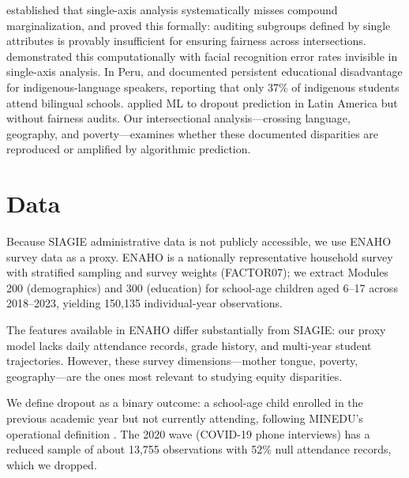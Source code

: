 \documentclass[notitlepage,12pt]{jedm}
\begin{document}
 established that single-axis analysis systematically misses compound marginalization, and  proved this formally: auditing subgroups defined by single attributes is provably insufficient for ensuring fairness across intersections.  demonstrated this computationally with facial recognition error rates invisible in single-axis analysis. In Peru,  and  documented persistent educational disadvantage for indigenous-language speakers, reporting that only 37\% of indigenous students attend bilingual schools.  applied ML to dropout prediction in Latin America but without fairness audits. Our intersectional analysis---crossing language, geography, and poverty---examines whether these documented disparities are reproduced or amplified by algorithmic prediction.

\section{Data}

Because SIAGIE administrative data is not publicly accessible, we use ENAHO survey data as a proxy. ENAHO is a nationally representative household survey with stratified sampling and survey weights (FACTOR07); we extract Modules 200 (demographics) and 300 (education) for school-age children aged 6--17 across 2018--2023, yielding 150,135 individual-year observations.

The features available in ENAHO differ substantially from SIAGIE: our proxy model lacks daily attendance records, grade history, and multi-year student trajectories. However, these survey dimensions---mother tongue, poverty, geography---are the ones most relevant to studying equity disparities.

We define dropout as a binary outcome: a school-age child enrolled in the previous academic year but not currently attending, following MINEDU's operational definition \cite{minedu2023alerta,inei2023enaho}. The 2020 wave (COVID-19 phone interviews) has a reduced sample of about 13,755 observations with 52\% null attendance records, which we dropped.

\begin{table}[htbp]
  \caption{Sample Description by Demographic Dimensions.}\vspace*{1ex}
  \label{tab:sample}
  
\end{table}
\end{document}
